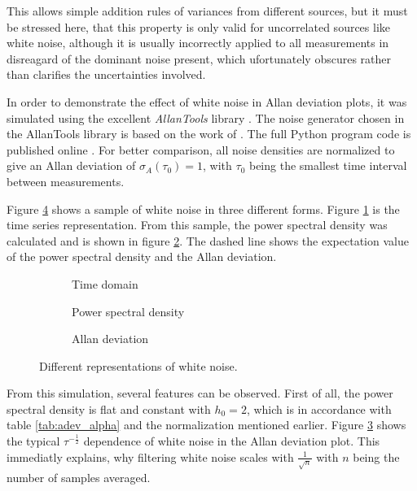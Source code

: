This allows simple addition rules of variances from different sources, but it must be stressed here, that this property is only valid for uncorrelated sources like white noise, although it is usually incorrectly applied to all measurements in disreagard of the dominant noise present, which ufortunately obscures rather than clarifies the uncertainties involved.

In order to demonstrate the effect of white noise in Allan deviation plots, it was simulated using the excellent \textit{AllanTools} library \cite{allantools}. The noise generator chosen in the AllanTools library is based on the work of \citeauthor{noise_generation} \cite{noise_generation}. The full Python program code is published online \cite{}. For better comparison, all noise densities are normalized to give an Allan deviation of $\sigma_A(\tau_0)=1$, with $\tau_0$ being the smallest time interval between measurements.

Figure \ref{fig:white_noise_simulated} shows a sample of white noise in three different forms. Figure \ref{fig:white_noise_time} is the time series representation. From this sample, the power spectral density was calculated and is shown in figure \ref{fig:white_noise_psd}. The dashed line shows the expectation value of the power spectral density and the Allan deviation.

\begin{figure}[ht]
    \centering
    \begin{subfigure}{0.32\linewidth}
        \scalebox{0.75}{%
            
        } %
        \caption{Time domain}
        \label{fig:white_noise_time}
    \end{subfigure}
    \hfill
    \begin{subfigure}{0.32\linewidth}
        \scalebox{0.75}{%
            
        } %
        \caption{Power spectral density}
        \label{fig:white_noise_psd}
    \end{subfigure}
    \hfill
    \begin{subfigure}{0.32\linewidth}
        \scalebox{0.75}{%
            
        } %
        \caption{Allan deviation}
        \label{fig:white_noise_adev}
    \end{subfigure}
    \caption{Different representations of white noise.}
    \label{fig:white_noise_simulated}
\end{figure}

From this simulation, several features can be observed. First of all, the power spectral density is flat and constant with $h_0 = 2$, which is in accordance with table \ref{tab:adev_alpha} and the normalization mentioned earlier. Figure \ref{fig:white_noise_adev} shows the typical $\tau^{-\frac1 2}$ dependence of white noise in the Allan deviation plot. This immediatly explains, why filtering white noise scales with $\frac{1}{\sqrt{n}}$ with $n$ being the number of samples averaged.

